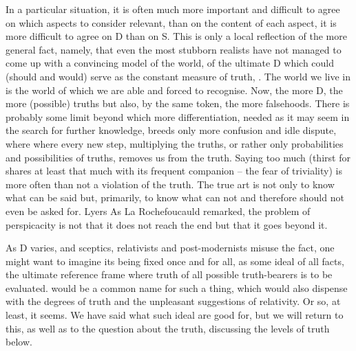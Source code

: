 In a particular situation, it is often much more important and difficult to
agree on which aspects to consider relevant, than on the content of each aspect,
it is more difficult to agree on D than on S. This is only a local reflection of
the more general fact, namely, that even the most stubborn realists have not
managed to come up with a convincing model of the world, of the ultimate D which could
(should and would) serve as the constant measure of truth,
. The world we live in is the world of 
which we are able and forced to recognise. %
Now, the more  D, the more (possible) truths but also, by the
same token, the more falsehoods.  There is probably some limit beyond which more
differentiation, needed as it may seem in the search for further knowledge,
breeds only more confusion and idle dispute, where  where every new step,
multiplying the truths, or rather only probabilities and possibilities of
truths, removes us from the truth. Saying too much (thirst for 
shares at least that much with its frequent companion -- the fear of triviality)
is more often than not a violation of the truth. The true art is not only to
know what can be said but, primarily, to know what can not and therefore should
not even be asked for. \citet{And it is no easie matter, being in the midst of
  the cariere of a discourse, to stop cunningly, to make sudden period, and to
  cut it off. And there is nothing whereby the cleane strenght of a horse is
  more knowne, than to make a readie and cleane stop.}{Lyers}{} As La
Rochefoucauld remarked, the problem of perspicacity is not that it does not
reach the end but that it goes beyond it.



As D varies, and sceptics, relativists and post-modernists misuse the fact, one
might want to imagine its being fixed once and for all, as some ideal
 of all facts, the ultimate reference frame where truth of all
possible truth-bearers is to be evaluated.  would be a common name
for such a thing, which would also dispense with the degrees of truth and
the unpleasant suggestions of relativity. Or so, at least, it seems. We have said
what such ideal  are good for, but we will return to this, as
well as to the question about the  truth, discussing the levels of
truth below.


